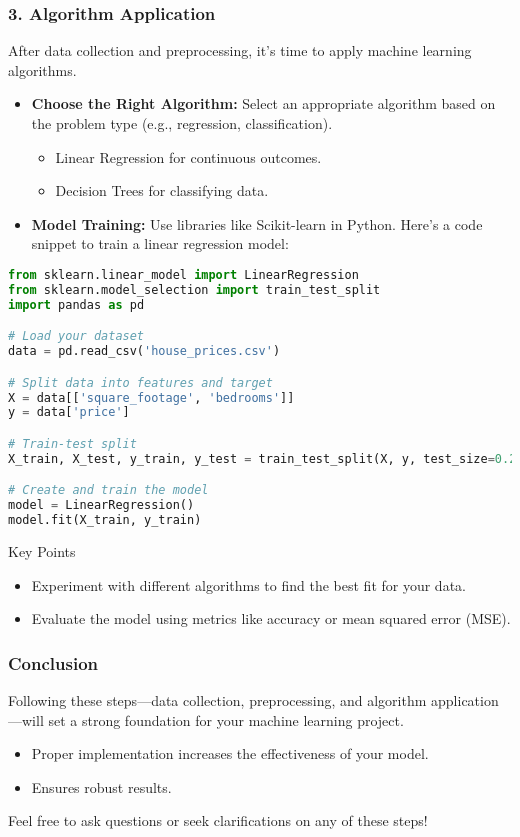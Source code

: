 \documentclass[aspectratio=169]{beamer}
\begin{document}
\begin{frame}[fragile]
    \frametitle{3. Algorithm Application}
    After data collection and preprocessing, it's time to apply machine learning algorithms.
    
    \begin{itemize}
        \item \textbf{Choose the Right Algorithm:} Select an appropriate algorithm based on the problem type (e.g., regression, classification).
        \begin{itemize}
            \item Linear Regression for continuous outcomes.
            \item Decision Trees for classifying data.
        \end{itemize}
        
        \item \textbf{Model Training:} Use libraries like Scikit-learn in Python. Here's a code snippet to train a linear regression model:
    \end{itemize}

    \begin{lstlisting}[language=Python]
from sklearn.linear_model import LinearRegression
from sklearn.model_selection import train_test_split
import pandas as pd

# Load your dataset
data = pd.read_csv('house_prices.csv')

# Split data into features and target
X = data[['square_footage', 'bedrooms']]
y = data['price']

# Train-test split
X_train, X_test, y_train, y_test = train_test_split(X, y, test_size=0.2, random_state=0)

# Create and train the model
model = LinearRegression()
model.fit(X_train, y_train)
    \end{lstlisting}

    \begin{block}{Key Points}
        \begin{itemize}
            \item Experiment with different algorithms to find the best fit for your data.
            \item Evaluate the model using metrics like accuracy or mean squared error (MSE).
        \end{itemize}
    \end{block}
\end{frame}

\begin{frame}
    \frametitle{Conclusion}
    Following these steps—data collection, preprocessing, and algorithm application—will set a strong foundation for your machine learning project.
    
    \begin{itemize}
        \item Proper implementation increases the effectiveness of your model.
        \item Ensures robust results.
    \end{itemize}

    Feel free to ask questions or seek clarifications on any of these steps!
\end{frame}
\end{document}
